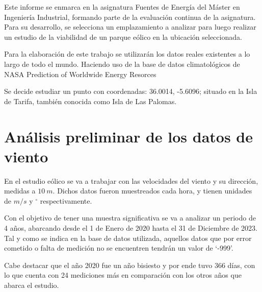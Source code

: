 \documentclass{IEEEtran}
\begin{document}
Este informe se enmarca en la asignatura Fuentes de Energía del Máster en Ingeniería Industrial, formando parte de la evaluación continua de la asignatura. Para su desarrollo, se selecciona un emplazamiento a analizar para luego realizar un estudio de la viabilidad de un parque eólico en la ubicación seleccionada.

Para la elaboración de este trabajo se utilizarán los datos reales existentes a lo largo de todo el mundo. Haciendo uso de la base de datos climatológicos de NASA Prediction of Worldwide Energy Resorces \cite{NASA2024}

Se decide estudiar un punto con coordenadas: 36.0014, -5.6096; situado en la Isla de Tarifa, también conocida como Isla de Las Palomas.

\section{Análisis preliminar de los datos de viento}



En el estudio eólico se va a trabajar con las velocidades del viento y su dirección, medidas a $10\ m$. Dichos datos fueron muestreados cada hora, y tienen unidades de $m/s$ y $^\circ$ respectivamente.


Con el objetivo de tener una muestra significativa se va a analizar un periodo de 4 años, abarcando desde el 1 de Enero de 2020 hasta el 31 de Diciembre de 2023. Tal y como se indica en la base de datos utilizada, aquellos datos que por error cometido o falta de medición no se encuentren tendrán un valor de `-999'.

Cabe destacar que el año 2020 fue un año bisiesto y por ende tuvo 366 días, con lo que cuenta con 24 mediciones más en comparación con los otros años que abarca el estudio.

\end{document}
